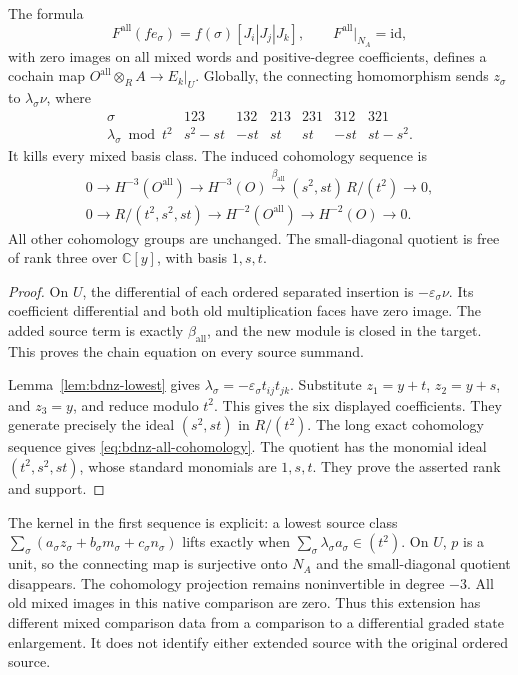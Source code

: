 \begin{theorem}\label{thm:bdnz-all-words}
The formula
\[
 F^{\mathrm{all}}(fe_\sigma)=f(\sigma)[J_i|J_j|J_k],
 \qquad F^{\mathrm{all}}|_{N_A}=\mathrm{id},
\]
with zero images on all mixed words and positive-degree coefficients, defines a cochain map
$O^{\mathrm{all}}\otimes_R A\to E_k|_U$.
Globally, the connecting homomorphism sends $z_\sigma$ to $\lambda_\sigma\nu$, where
\[
 \begin{array}{c|rrrrrr}
 \sigma&123&132&213&231&312&321\\ \hline
 \lambda_\sigma\bmod t^2&s^2-st&-st&st&st&-st&st-s^2.
 \end{array}
\]
It kills every mixed basis class.
The induced cohomology sequence is
\begin{equation}\label{eq:bdnz-all-cohomology}
 \begin{gathered}
 0\longrightarrow H^{-3}(O^{\mathrm{all}})
 \longrightarrow H^{-3}(O)
 \xrightarrow{\beta_{\mathrm{all}}}(s^2,st)\,R/(t^2)
 \longrightarrow0,\\
 0\longrightarrow R/(t^2,s^2,st)
 \longrightarrow H^{-2}(O^{\mathrm{all}})
 \longrightarrow H^{-2}(O)\longrightarrow0.
 \end{gathered}
\end{equation}
All other cohomology groups are unchanged.
The small-diagonal quotient is free of rank three over $\mathbb C[y]$, with basis $1,s,t$.
\end{theorem}
\begin{proof}
On $U$, the differential of each ordered separated insertion is
$-\varepsilon_\sigma\nu$.
Its coefficient differential and both old multiplication faces have zero image.
The added source term is exactly $\beta_{\mathrm{all}}$, and the new module is closed in the target.
This proves the chain equation on every source summand.

Lemma~\ref{lem:bdnz-lowest} gives
$\lambda_\sigma=-\varepsilon_\sigma t_{ij}t_{jk}$.
Substitute $z_1=y+t$, $z_2=y+s$, and $z_3=y$, and reduce modulo $t^2$.
This gives the six displayed coefficients.
They generate precisely the ideal $(s^2,st)$ in $R/(t^2)$.
The long exact cohomology sequence gives \eqref{eq:bdnz-all-cohomology}.
The quotient has the monomial ideal $(t^2,s^2,st)$, whose standard monomials are $1,s,t$.
They prove the asserted rank and support.
\end{proof}

The kernel in the first sequence is explicit: a lowest source class
$\sum_\sigma(a_\sigma z_\sigma+b_\sigma m_\sigma+c_\sigma n_\sigma)$ lifts exactly when
$\sum_\sigma\lambda_\sigma a_\sigma\in(t^2)$.
On $U$, $p$ is a unit, so the connecting map is surjective onto $N_A$ and the small-diagonal quotient disappears.
The cohomology projection remains noninvertible in degree $-3$.
All old mixed images in this native comparison are zero.
Thus this extension has different mixed comparison data from a comparison to a differential graded state enlargement.
It does not identify either extended source with the original ordered source.

